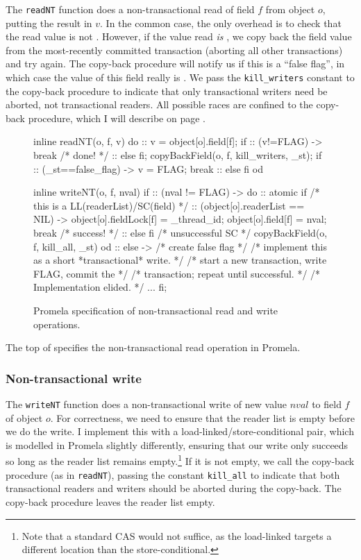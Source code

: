 The {\tt readNT} function does a non-transactional read of field $f$ from
object $o$, putting the result in $v$.  
In the common case, the only overhead is to check that
the read value is not \FLAG.  However, if the value read \emph{is}
\FLAG, we copy back the field value 
from the most-recently committed transaction (aborting all other
transactions) and try again.  The copy-back procedure will notify
us if this is a ``false flag'', in which case the value of this
field really is \FLAG.  We pass the {\tt kill\_writers} constant
to the copy-back procedure to
indicate that only transactional writers need be aborted, not
transactional readers.
All possible races are confined to the copy-back procedure, which I
will describe on page \pageref{sec:copyback}.

\begin{figure}
\begin{inlinecode}
inline readNT(o, f, v) {
  do
  :: v = object[o].field[f];
     if
     :: (v!=FLAG) -> break /* done! */
     :: else
     fi;
     copyBackField(o, f, kill_writers, _st);
     if
     :: (_st==false_flag) ->
        v = FLAG;
        break
     :: else
     fi
  od
}

inline writeNT(o, f, nval) {
  if
  :: (nval != FLAG) ->
     do
     :: atomic {
          if /* this is a LL(readerList)/SC(field) */
          :: (object[o].readerList == NIL) ->
             object[o].fieldLock[f] = _thread_id;
             object[o].field[f] = nval;
             break /* success! */
          :: else
          fi
        }
        /* unsuccessful SC */
        copyBackField(o, f, kill_all, _st)
     od
  :: else -> /* create false flag */
     /* implement this as a short *transactional* write. */
     /* start a new transaction, write FLAG, commit the */
     /* transaction; repeat until successful. */
     /* Implementation elided. */
     ...
  fi;
}
\end{inlinecode}
\caption{Promela specification of non-transactional read and write operations.}
\label{fig:promrwnt}
\end{figure}
The top of  specifies the non-transactional read operation in
Promela.

\subsubsection{Non-transactional write}
The {\tt writeNT} function does a non-transactional write of new value $nval$
to field $f$ of object $o$.  For correctness, we need to ensure that
the reader list is empty before we do the write.  I implement this
with a load-linked/store-conditional pair, which is modelled in
Promela slightly differently, ensuring that our write only succeeds
so long as the reader list remains empty.\footnote{Note that a
  standard CAS would not suffice, as the load-linked targets a
  different location than the store-conditional.}
If it is not empty, we
call the copy-back procedure (as in {\tt readNT}), passing the
constant {\tt kill\_all} to indicate that both transactional readers
and writers should be aborted during the copy-back.  The copy-back
procedure leaves the reader list empty.

